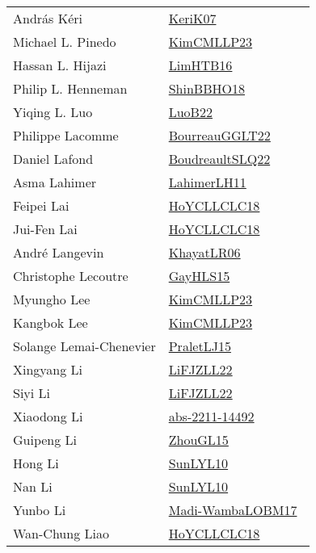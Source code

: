 {\begin{longtable}{p{4cm}p{20cm}}
Andr{\'{a}}s K{\'{e}}ri & \href{works/KeriK07.pdf}{KeriK07}~\cite{KeriK07}\\
Michael L. Pinedo & \href{works/KimCMLLP23.pdf}{KimCMLLP23}~\cite{KimCMLLP23}\\
Hassan L. Hijazi & \href{works/LimHTB16.pdf}{LimHTB16}~\cite{LimHTB16}\\
Philip L. Henneman & \href{works/ShinBBHO18.pdf}{ShinBBHO18}~\cite{ShinBBHO18}\\
Yiqing L. Luo & \href{works/LuoB22.pdf}{LuoB22}~\cite{LuoB22}\\
Philippe Lacomme & \href{works/BourreauGGLT22.pdf}{BourreauGGLT22}~\cite{BourreauGGLT22}\\
Daniel Lafond & \href{works/BoudreaultSLQ22.pdf}{BoudreaultSLQ22}~\cite{BoudreaultSLQ22}\\
Asma Lahimer & \href{works/LahimerLH11.pdf}{LahimerLH11}~\cite{LahimerLH11}\\
Feipei Lai & \href{works/HoYCLLCLC18.pdf}{HoYCLLCLC18}~\cite{HoYCLLCLC18}\\
Jui{-}Fen Lai & \href{works/HoYCLLCLC18.pdf}{HoYCLLCLC18}~\cite{HoYCLLCLC18}\\
Andr{\'{e}} Langevin & \href{works/KhayatLR06.pdf}{KhayatLR06}~\cite{KhayatLR06}\\
Christophe Lecoutre & \href{works/GayHLS15.pdf}{GayHLS15}~\cite{GayHLS15}\\
Myungho Lee & \href{works/KimCMLLP23.pdf}{KimCMLLP23}~\cite{KimCMLLP23}\\
Kangbok Lee & \href{works/KimCMLLP23.pdf}{KimCMLLP23}~\cite{KimCMLLP23}\\
Solange Lemai{-}Chenevier & \href{works/PraletLJ15.pdf}{PraletLJ15}~\cite{PraletLJ15}\\
Xingyang Li & \href{works/LiFJZLL22.pdf}{LiFJZLL22}~\cite{LiFJZLL22}\\
Siyi Li & \href{works/LiFJZLL22.pdf}{LiFJZLL22}~\cite{LiFJZLL22}\\
Xiaodong Li & \href{works/abs-2211-14492.pdf}{abs-2211-14492}~\cite{abs-2211-14492}\\
Guipeng Li & \href{works/ZhouGL15.pdf}{ZhouGL15}~\cite{ZhouGL15}\\
Hong Li & \href{works/SunLYL10.pdf}{SunLYL10}~\cite{SunLYL10}\\
Nan Li & \href{works/SunLYL10.pdf}{SunLYL10}~\cite{SunLYL10}\\
Yunbo Li & \href{works/Madi-WambaLOBM17.pdf}{Madi-WambaLOBM17}~\cite{Madi-WambaLOBM17}\\
Wan{-}Chung Liao & \href{works/HoYCLLCLC18.pdf}{HoYCLLCLC18}~\cite{HoYCLLCLC18}\\

\end{longtable}}
